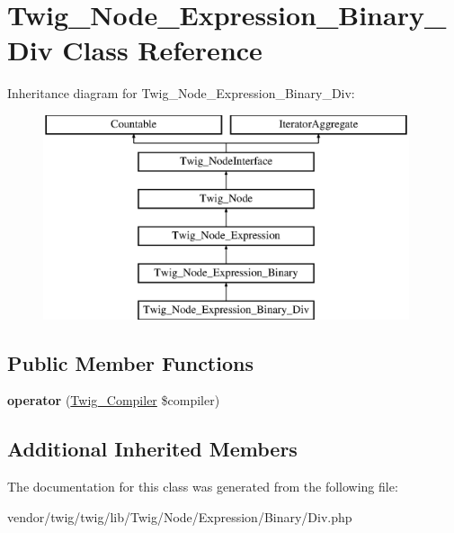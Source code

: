 \hypertarget{classTwig__Node__Expression__Binary__Div}{}\section{Twig\+\_\+\+Node\+\_\+\+Expression\+\_\+\+Binary\+\_\+\+Div Class Reference}
\label{classTwig__Node__Expression__Binary__Div}
Inheritance diagram for Twig\+\_\+\+Node\+\_\+\+Expression\+\_\+\+Binary\+\_\+\+Div\+:\begin{figure}[H]
\begin{center}
\leavevmode
\includegraphics[height=6.000000cm]{classTwig__Node__Expression__Binary__Div}
\end{center}
\end{figure}
\subsection*{Public Member Functions}
\begin{DoxyCompactItemize}
\item 
{\bfseries operator} (\hyperlink{classTwig__Compiler}{Twig\+\_\+\+Compiler} \$compiler)\hypertarget{classTwig__Node__Expression__Binary__Div_ad8a8dd44f0217f6d77c3dcff31ca3e64}{}\label{classTwig__Node__Expression__Binary__Div_ad8a8dd44f0217f6d77c3dcff31ca3e64}

\end{DoxyCompactItemize}
\subsection*{Additional Inherited Members}


The documentation for this class was generated from the following file\+:\begin{DoxyCompactItemize}
\item 
vendor/twig/twig/lib/\+Twig/\+Node/\+Expression/\+Binary/Div.\+php\end{DoxyCompactItemize}
